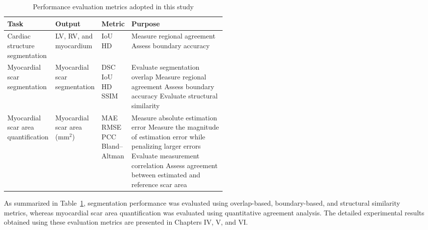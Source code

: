 \begin{table}
	\centering
	\small
	\caption{Performance evaluation metrics adopted in this study}
	\label{tab:evaluation-metrics}
	
	\renewcommand{\arraystretch}{1.3}
	\begin{tabularx}{\linewidth}{>{\raggedright\arraybackslash}p{0.20\linewidth} >{\raggedright\arraybackslash}p{0.20\linewidth} p{0.12\linewidth} >{\raggedright\arraybackslash}X}
		\toprule
		\textbf{Task} & \textbf{Output} & \textbf{Metric} & \textbf{Purpose} \\ \midrule
		
		Cardiac structure segmentation & 
		LV, RV, and myocardium & 
		IoU \newline HD & 
		Measure regional agreement \newline Assess boundary accuracy \\ \addlinespace %
		
		Myocardial scar segmentation & 
		Myocardial scar segmentation & 
		DSC \newline IoU \newline HD \newline SSIM & 
		Evaluate segmentation overlap \newline Measure regional agreement \newline Assess boundary accuracy \newline Evaluate structural similarity \\ \addlinespace %
		
		Myocardial scar area quantification & 
		Myocardial scar area (mm$^2$) & 
		MAE \newline RMSE \newline PCC \newline Bland--Altman & 
		Measure absolute estimation error \newline Measure the magnitude of estimation error while penalizing larger errors \newline Evaluate measurement correlation \newline Assess agreement between estimated and reference scar area \\ \bottomrule
	\end{tabularx}
\end{table}

As summarized in Table~\ref{tab:evaluation-metrics}, segmentation performance was evaluated using overlap-based, boundary-based, and structural similarity metrics, whereas myocardial scar area quantification was evaluated using quantitative agreement analysis. The detailed experimental results obtained using these evaluation metrics are presented in Chapters IV, V, and VI.